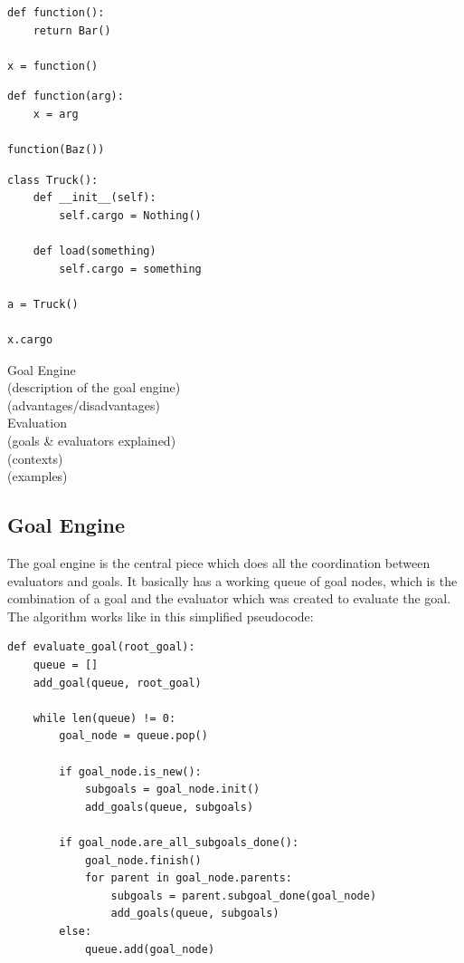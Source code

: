 \documentclass[12pt,halfparskip,DIV11,BCOR10mm]{scrreprt}
\begin{document}
\begin{lstlisting}
def function():
	return Bar()

x = function()
\end{lstlisting}

\begin{lstlisting}
def function(arg):
	x = arg
	
function(Baz())
\end{lstlisting}

\begin{lstlisting}
class Truck():
	def __init__(self):
		self.cargo = Nothing()
	
	def load(something)
		self.cargo = something

a = Truck()

x.cargo 
\end{lstlisting}


Goal Engine \\
 (description of the goal engine)\\
 (advantages/disadvantages)\\
Evaluation\\
 (goals \& evaluators explained)\\
 (contexts)\\
 (examples)


\subsection{Goal Engine}

The goal engine is the central piece which does all the coordination between evaluators and goals. It basically has a working queue of goal nodes, which is the combination of a goal and the evaluator which was created to evaluate the goal. The algorithm works like in this simplified pseudocode:

\begin{lstlisting}
def evaluate_goal(root_goal):
    queue = []
    add_goal(queue, root_goal)

    while len(queue) != 0:
        goal_node = queue.pop()

        if goal_node.is_new():
            subgoals = goal_node.init()
            add_goals(queue, subgoals)

        if goal_node.are_all_subgoals_done():
            goal_node.finish()
            for parent in goal_node.parents:
                subgoals = parent.subgoal_done(goal_node)
                add_goals(queue, subgoals)
        else:
            queue.add(goal_node)
\end{lstlisting}
\end{document}
